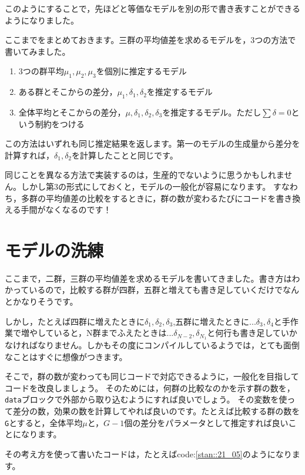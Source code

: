\documentclass{ltjsbook}
\begin{document}
このようにすることで，先ほどと等価なモデルを別の形で書き表すことができるようになりました。

ここまでをまとめておきます。三群の平均値差を求めるモデルを，3つの方法で書いてみました。
\begin{enumerate}
  \item 3つの群平均$\mu_1,\mu_2,\mu_3$を個別に推定するモデル
  \item ある群とそこからの差分，$\mu_1,\delta_1,\delta_2$を推定するモデル
  \item 全体平均とそこからの差分，$\mu,\delta_1,\delta_2,\delta_3$を推定するモデル。ただし$\sum \delta = 0$という制約をつける
\end{enumerate}
この方法はいずれも同じ推定結果を返します。第一のモデルの生成量から差分を計算すれば，$\delta_1,\delta_2$を計算したことと同じです。

同じことを異なる方法で実装するのは，生産的でないように思うかもしれません。しかし第3の形式にしておくと，モデルの一般化が容易になります。
すなわち，多群の平均値差の比較をするときに，群の数が変わるたびにコードを書き換える手間がなくなるのです！
\section{モデルの洗練}
ここまで，二群，三群の平均値差を求めるモデルを書いてきました。書き方はわかっているので，比較する群が四群，五群と増えても書き足していくだけでなんとかなりそうです。

しかし，たとえば四群に増えたときに$\delta_1,\delta_2,\delta_3$,五群に増えたときに$...\delta_3,\delta_4$と手作業で増やしていると，N群までふえたときは$...\delta_{N-2},\delta_{N_1}$と何行も書き足していかなければなりません。しかもその度にコンパイルしているようでは，とても面倒なことはすぐに想像がつきます。

そこで，群の数が変わっても同じコードで対応できるように，一般化を目指してコードを改良しましょう。
そのためには，何群の比較なのかを示す群の数を，\verb|data|ブロックで外部から取り込むようにすれば良いでしょう。
その変数を使って差分の数，効果の数を計算してやれば良いのです。たとえば比較する群の数を\verb|G|とすると，全体平均$\mu$と，$G-1$個の差分をパラメータとして推定すれば良いことになります。

その考え方を使って書いたコードは，たとえばcode:\ref{stan::21_05}のようになります。
\end{document}
